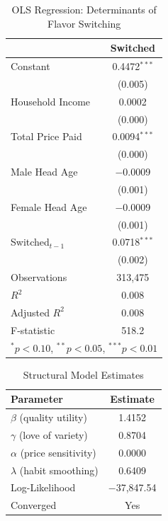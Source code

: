 \documentclass[11pt]{article}
\theoremstyle{definition}
\theoremstyle{remark}
\begin{document}
\begin{table}[htbp]
    \centering
    \caption{OLS Regression: Determinants of Flavor Switching}
    \label{tab:ols_switch}
    \begin{tabular}{lc}
        \toprule
         & Switched \\
        \midrule
        \quad Constant & 0.4472$^{***}$ \\
                        & (0.005) \\
        \quad Household Income & 0.0002 \\
                                & (0.000) \\
        \quad Total Price Paid & 0.0094$^{***}$ \\
                                & (0.000) \\
        \quad Male Head Age & $-$0.0009 \\
                             & (0.001) \\
        \quad Female Head Age & $-$0.0009 \\
                               & (0.001) \\
        \quad Switched$_{t-1}$ & 0.0718$^{***}$ \\
                                & (0.002) \\
        \midrule
        Observations & 313{,}475 \\
        $R^2$ & 0.008 \\
        Adjusted $R^2$ & 0.008 \\
        F-statistic & 518.2 \\
        \bottomrule
        \multicolumn{2}{l}{\footnotesize $^{*}p<0.10$, $^{**}p<0.05$, $^{***}p<0.01$} \\
    \end{tabular}
\end{table}

\begin{table}[htbp]
    \centering
    \caption{Structural Model Estimates}
    \label{tab:structural_est}
    \begin{tabular}{lc}
        \toprule
        Parameter & Estimate \\
        \midrule
        $\beta$ (quality utility)        & 1.4152 \\
        $\gamma$ (love of variety)       & 0.8704 \\
        $\alpha$ (price sensitivity)     & 0.0000 \\
        $\lambda$ (habit smoothing)      & 0.6409 \\
        \midrule
        Log-Likelihood & $-$37{,}847.54 \\
        Converged & Yes \\
        \bottomrule
    \end{tabular}
\end{table}
\end{document}
